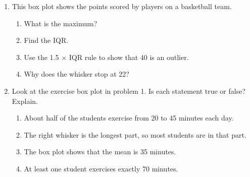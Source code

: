 \documentclass[11pt]{article}
\begin{document}
\begin{enumerate}
\newpage
\item This box plot shows the points scored by players on a basketball team.
\begin{center}\end{center}
\begin{enumerate}[itemsep=1.6em]
  \item What is the maximum? 
  \item Find the IQR. 
  \item Use the 1.5 $\times$ IQR rule to show that 40 is an outlier.

  \work{3em}
  \item Why does the whisker stop at 22?

\end{enumerate}
\work{2em}

\item Look at the exercise box plot in problem 1. Is each statement true or false? Explain.
\begin{enumerate}[itemsep=\ifkey 2.4em\else 5em\fi]
  \item About half of the students exercise from 20 to 45 minutes each day.

  \item The right whisker is the longest part, so most students are in that part.

  \item The box plot shows that the mean is 35 minutes.

  \item At least one student exercises exactly 70 minutes.

\end{enumerate}

\end{enumerate}
\end{document}
